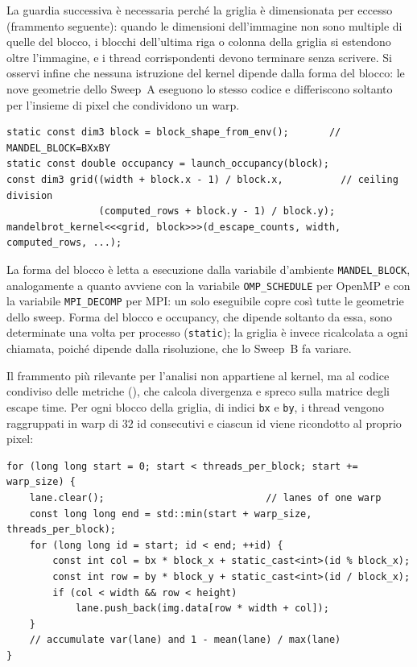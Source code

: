 La guardia successiva è necessaria perché la griglia è dimensionata per eccesso
(frammento seguente): quando le dimensioni dell'immagine non sono multiple di
quelle del blocco, i blocchi dell'ultima riga o colonna della griglia si
estendono oltre l'immagine, e i thread corrispondenti devono terminare senza
scrivere. Si osservi infine che nessuna istruzione del kernel dipende dalla forma
del blocco: le nove geometrie dello Sweep~A eseguono lo stesso codice e
differiscono soltanto per l'insieme di pixel che condividono un warp.

\begin{verbatim}
static const dim3 block = block_shape_from_env();       // MANDEL_BLOCK=BXxBY
static const double occupancy = launch_occupancy(block);
const dim3 grid((width + block.x - 1) / block.x,          // ceiling division
                (computed_rows + block.y - 1) / block.y);
mandelbrot_kernel<<<grid, block>>>(d_escape_counts, width, computed_rows, ...);
\end{verbatim}

La forma del blocco è letta a esecuzione dalla variabile d'ambiente
\texttt{MANDEL\_BLOCK}, analogamente a quanto avviene con la variabile
\texttt{OMP\_SCHEDULE} per OpenMP e con la variabile \texttt{MPI\_DECOMP} per
MPI: un solo eseguibile copre così tutte le geometrie dello sweep. Forma del blocco e occupancy, che dipende soltanto da essa, sono
determinate una volta per processo (\texttt{static}); la griglia è invece
ricalcolata a ogni chiamata, poiché dipende dalla risoluzione, che lo Sweep~B fa
variare.

Il frammento più rilevante per l'analisi non appartiene al kernel, ma al codice
condiviso delle metriche (), che calcola
divergenza e spreco sulla matrice degli escape time. Per
ogni blocco della griglia, di indici \texttt{bx} e \texttt{by}, i thread vengono
raggruppati in warp di $32$ id consecutivi e ciascun id viene ricondotto al
proprio pixel:

\begin{verbatim}
for (long long start = 0; start < threads_per_block; start += warp_size) {
    lane.clear();                            // lanes of one warp
    const long long end = std::min(start + warp_size, threads_per_block);
    for (long long id = start; id < end; ++id) {
        const int col = bx * block_x + static_cast<int>(id % block_x);
        const int row = by * block_y + static_cast<int>(id / block_x);
        if (col < width && row < height)
            lane.push_back(img.data[row * width + col]);
    }
    // accumulate var(lane) and 1 - mean(lane) / max(lane)
}
\end{verbatim}

